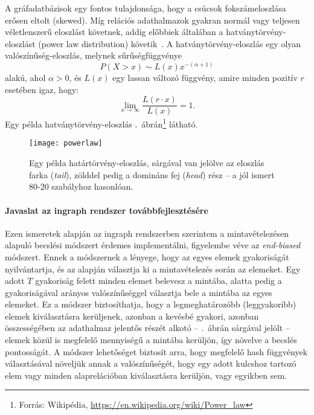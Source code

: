 A gráfadatbázisok egy fontos tulajdonsága, hogy a csúcsok fokszámeloszlása erősen eltolt (skewed).
Míg relációs adathalmazok gyakran normál vagy teljesen véletlenszerű eloszlást követnek,
addig előbbiek általában a hatványtörvény-eloszlást (power law distribution) követik~\cite{Barabasi:2003:ITS}.
A hatványtörvény-eloszlás egy olyan valószínűség-eloszlás, melynek sűrűségfüggvénye
$$ P(X>x)\sim L(x)x^{-(\alpha +1)} $$
alakú, ahol $\alpha > 0$, és $L(x)$ egy lassan változó függvény, amire minden pozitív $r$ esetében igaz, hogy:
$$\lim _{x\rightarrow \infty } \frac{ L(r \cdot x) }{ L(x) } = 1.$$
Egy példa hatványtörvény-eloszlás .~ábrán\footnote{Forrás: Wikipédia, \url{https://en.wikipedia.org/wiki/Power_law}} látható.
\begin{figure}[ht]
	\centering
	\texttt{[image: powerlaw]}
	\caption[Egy példa határtörvény-eloszlás]{Egy példa határtörvény-eloszlás, sárgával van jelölve az eloszlás farka (\emph{tail}), zölddel pedig a domináns fej (\emph{head}) rész -- a jól ismert 80-20 szabályhoz hasonlóan.}
	\label{fig:powerlaw}
\end{figure}
\paragraph{Javaslat az ingraph rendszer továbbfejlesztésére}
Ezen ismeretek alapján az ingraph rendszerben szerintem a mintavételezésen alapuló becslési módszert érdemes implementálni, figyelembe véve az \textit{end-biased}~\cite{DBLP:conf/icde/EstanN06} módszert. Ennek a módszernek a lényege, hogy az egyes elemek gyakoriságát nyilvántartja, és az alapján választja ki a mintavételezés során az elemeket. Egy adott $T$ gyakoriság felett minden elemet belevesz a mintába, alatta pedig a gyakoriságával arányos valószínűséggel választja bele a mintába az egyes elemeket. Ez a módszer biztosíthatja, hogy a legmeghatározóbb (leggyakoribb) elemek kiválasztásra kerüljenek, azonban a kevésbé gyakori, azonban összességében az adathalmaz jelentős részét alkotó -- .~ábrán sárgával jelölt -- elemek közül is megfelelő mennyiségű a mintába kerüljön, így növelve a becslés pontosságát. A módszer lehetőséget biztosít arra, hogy megfelelő hash függvények választásával növeljük annak a valószínűségét, hogy egy adott kulcshoz tartozó elem vagy minden alaprelációban kiválasztásra kerüljön, vagy egyikben sem.


